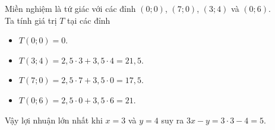 \begin{ex}
{\begin{center}
		\end{center}
		Miền nghiệm là tứ giác với các đỉnh $(0;0)$, $(7;0)$, $(3;4)$ và $(0;6)$.\\
		Ta tính giá trị  $T$ tại các đỉnh
		\begin{itemize}
			\item $T(0;0)=0$.
			\item $T(3;4)=2{,}5\cdot3+3{,}5\cdot4=21{,}5$.
			\item $T(7;0)=2{,}5\cdot7+3{,}5\cdot0=17{,}5$.
			\item $T(0;6)=2{,}5\cdot0+3{,}5\cdot6=21$.
		\end{itemize}
		Vậy lợi nhuận lớn nhất khi $x=3$ và $y=4$ suy ra $3x-y=3\cdot3-4=5$.
	}
\end{ex}
